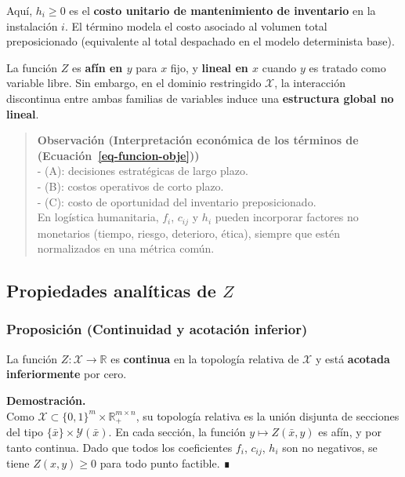 \documentclass[
  spanish,
  us-letterpaper,
]{scrreprt}
\numberwithin{equation}{section}
\begin{document}
Aquí, \(h_i \ge 0\) es el \textbf{costo unitario de mantenimiento de
inventario} en la instalación \(i\). El término modela el costo asociado
al volumen total preposicionado (equivalente al total despachado en el
modelo determinista base).

La función \(Z\) es \textbf{afín en \(y\)} para \(x\) fijo, y
\textbf{lineal en \(x\)} cuando \(y\) es tratado como variable libre.
Sin embargo, en el dominio restringido \(\mathcal{X}\), la interacción
discontinua entre ambas familias de variables induce una
\textbf{estructura global no lineal}.

\begin{quote}
\textbf{Observación (Interpretación económica de los términos de
(Ecuación~\ref{eq-funcion-obje}))}\\
- (A): decisiones estratégicas de largo plazo.\\
- (B): costos operativos de corto plazo.\\
- (C): costo de oportunidad del inventario preposicionado.\\
En logística humanitaria, \(f_i\), \(c_{ij}\) y \(h_i\) pueden
incorporar factores no monetarios (tiempo, riesgo, deterioro, ética),
siempre que estén normalizados en una métrica común.
\end{quote}

\subsection{\texorpdfstring{\textbf{Propiedades analíticas de
\(Z\)}}{Propiedades analíticas de Z}}\label{propiedades-analuxedticas-de-z}

\subsubsection{\texorpdfstring{\textbf{Proposición (Continuidad y
acotación
inferior)}}{Proposición (Continuidad y acotación inferior)}}\label{proposiciuxf3n-continuidad-y-acotaciuxf3n-inferior}

La función \(Z : \mathcal{X} \to \mathbb{R}\) es \textbf{continua} en la
topología relativa de \(\mathcal{X}\) y está \textbf{acotada
inferiormente} por cero.

\textbf{Demostración.}\\
Como \(\mathcal{X} \subset \{0,1\}^m \times \mathbb{R}_+^{m \times n}\),
su topología relativa es la unión disjunta de secciones del tipo
\(\{\bar{x}\} \times \mathcal{Y}(\bar{x})\). En cada sección, la función
\(y \mapsto Z(\bar{x}, y)\) es afín, y por tanto continua. Dado que
todos los coeficientes \(f_i\), \(c_{ij}\), \(h_i\) son no negativos, se
tiene \(Z(x, y) \ge 0\) para todo punto factible. ∎
\end{document}
